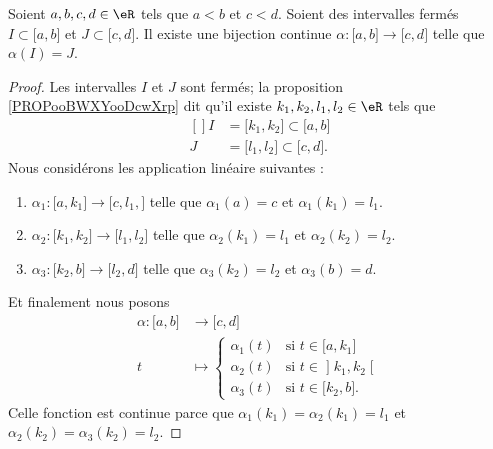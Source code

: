 \begin{lemma}	\label{LEMooRWKAooLRdUdr}
	Soient \( a,b,c,d\in \eR\) tels que \( a<b\) et \( c<d\). Soient des intervalles fermés \( I\subset\mathopen[ a,b\mathclose] \) et \( J\subset\mathopen[ c,d\mathclose]\). Il existe une bijection continue \(\alpha \colon \mathopen[ a,b\mathclose]\to  \mathopen[ c,d\mathclose] \) telle que \( \alpha(I)=J\).
\end{lemma}

\begin{proof}
	Les intervalles \( I\) et \( J\) sont fermés; la proposition \ref{PROPooBWXYooDcwXrp} dit qu'il existe \( k_1,k_2,l_1,l_2\in \eR\) tels que
	\begin{equation}
		\begin{aligned}[]
			I & =\mathopen[ k_1,k_2\mathclose]\subset \mathopen[ a,b\mathclose]  \\
			J & =\mathopen[ l_1,l_2\mathclose]\subset \mathopen[ c,d\mathclose].
		\end{aligned}
	\end{equation}
	Nous considérons les application linéaire suivantes :
	\begin{enumerate}
		\item
		      \(\alpha_1 \colon \mathopen[ a,k_1\mathclose]\to \mathopen[ c,l_1,\mathclose]  \) telle que \( \alpha_1(a)=c\) et \( \alpha_1(k_1)=l_1\).
		\item
		      \(\alpha_2 \colon \mathopen[ k_1,k_2\mathclose]\to \mathopen[ l_1,l_2\mathclose]  \) telle que \( \alpha_2(k_1)=l_1\) et \( \alpha_2(k_2)=l_2\).
		\item
		      \(\alpha_3 \colon \mathopen[ k_2,b\mathclose]\to \mathopen[ l_2,d\mathclose]  \) telle que \( \alpha_3(k_2)=l_2\) et \( \alpha_3(b)=d\).
	\end{enumerate}
	Et finalement nous posons
	\begin{equation}
		\begin{aligned}
			\alpha\colon \mathopen[ a,b\mathclose] & \to\mathopen[ c,d\mathclose]                                      \\
			t                                      & \mapsto \begin{cases}
				                                                 \alpha_1(t) & \text{si } t\in\mathopen[ a,k_1\mathclose]  \\
				                                                 \alpha_2(t) & \text{si }t\in\mathopen] k_1,k_2\mathclose[ \\
				                                                 \alpha_3(t) & \text{si }t\in\mathopen[ k_2,b\mathclose].
			                                                 \end{cases}
		\end{aligned}
	\end{equation}
	Celle fonction est continue parce que  \( \alpha_1(k_1)=\alpha_2(k_1)=l_1\) et \( \alpha_2(k_2)=\alpha_3(k_2)=l_2\).
\end{proof}


